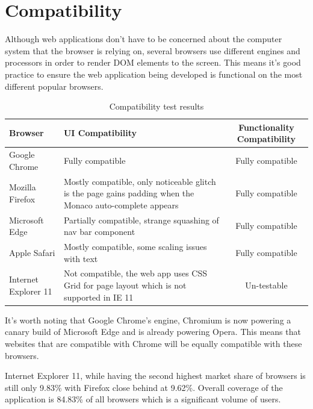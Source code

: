 




\section{Compatibility} \label{test:compat}

Although web applications don't have to be concerned about the computer system that the browser is relying on, several browsers use different engines and processors in order to render DOM elements to the screen. This means it's good practice to ensure the web application being developed is functional on the most different popular browsers.

\begin{table}[h]
    \centering
    \begin{tabulary}{\textwidth}{l|L|c}
        \hline
        \hline
        \textbf{Browser} & \textbf{UI Compatibility} & \textbf{Functionality Compatibility} \\
        \hline
        \hline
        Google Chrome & Fully compatible & Fully compatible \\
        Mozilla Firefox & Mostly compatible, only noticeable glitch is the page gains padding when the Monaco auto-complete appears & Fully compatible \\
        Microsoft Edge & Partially compatible, strange squashing of nav bar component & Fully compatible \\
        Apple Safari & Mostly compatible, some scaling issues with text & Fully compatible \\
        Internet Explorer 11 & Not compatible, the web app uses CSS Grid for page layout which is not supported in IE 11 & Un-testable
    \end{tabulary}
    \caption{Compatibility test results}
\end{table}

It's worth noting that Google Chrome's engine, Chromium is now powering a canary build of Microsoft Edge and is already powering Opera. This means that websites that are compatible with Chrome will be equally compatible with these browsers.  

Internet Explorer 11, while having the second highest market share of browsers \cite{browser-stats} is still only 9.83\% with Firefox close behind at 9.62\%. Overall coverage of the application is 84.83\% of all browsers which is a significant volume of users.


